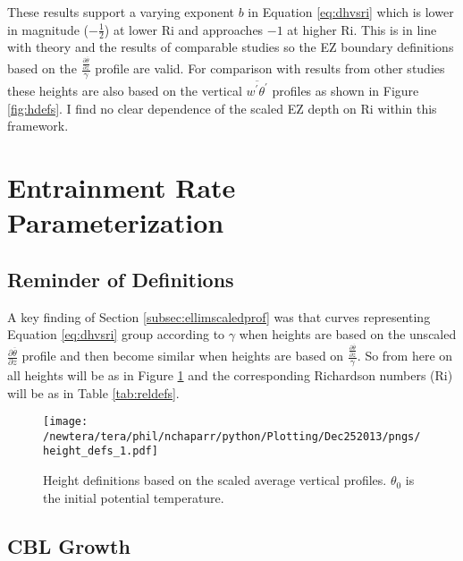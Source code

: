 These results support a varying exponent $b$ in Equation \ref{eq:dhvsri} which is lower in magnitude ($-\frac{1}{2}$) at lower \acs{Ri} and approaches $-1$ at higher \acs{Ri}.  This is in line with theory and the results of comparable studies so the \acs{EZ} boundary definitions based on the $\frac{\frac{\partial \overline{\theta}}{\partial z}}{\gamma}$ profile are valid.  For comparison with results from other studies these heights are also based on the vertical $\overline{w^{'}\theta^{'}}$ profiles as shown in Figure \ref{fig:hdefs}. I find no clear dependence of the scaled \acs{EZ} depth on \acs{Ri} within this framework. \\

\clearpage

\section{Entrainment Rate Parameterization}
\label{sec:weri}
\FloatBarrier


\subsection{Reminder of Definitions}

A key finding of Section \ref{subsec:ellimscaledprof} was that curves representing Equation \ref{eq:dhvsri} group according
to $\gamma$ when heights are based on the unscaled $\frac{\partial \overline{\theta}}{\partial z}$ profile and then become similar
when heights are based on $\frac{\frac{\partial \overline{\theta}}{\partial z}}{\gamma}$.  So from here on all heights will be as in
Figure \ref{fig:hdefs1} and the corresponding Richardson numbers (\acs{Ri}) will be as in Table \ref{tab:reldefs}.\\ 

\begin{figure}[htbp]
    \centering
    \texttt{[image: /newtera/tera/phil/nchaparr/python/Plotting/Dec252013/pngs/height\_defs\_1.pdf]}
    \caption[Height Definitions]{Height definitions based on the scaled average vertical profiles. $\theta_{0}$ is the initial potential temperature.}
    \label{fig:hdefs1}   %
\end{figure}

\subsection{\acs{CBL} Growth}


